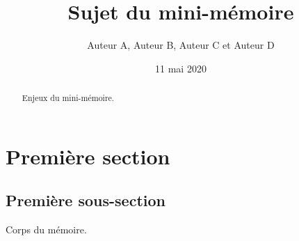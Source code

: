 \documentclass[10pt,a4paper]{article}
\title{Sujet du mini-mémoire}
\author{Auteur A, Auteur B, Auteur C et Auteur D}
\date{11 mai 2020}
\begin{document}
\maketitle


\begin{abstract}
Enjeux du mini-mémoire.
\end{abstract}

\section{Première section}
\subsection{Première sous-section}

Corps du mémoire.
\end{document}
